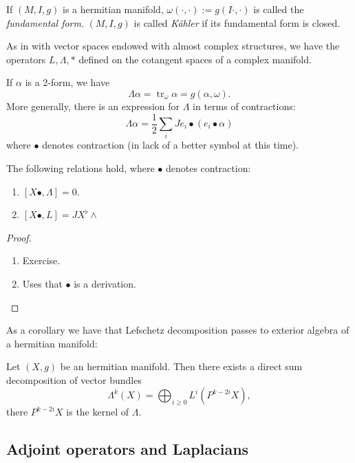 \begin{definition}
\label{definition-fundamental-form}
If $(M,I,g)$ is a hermitian manifold,
$\omega(\cdot,\cdot):=g(I\cdot,\cdot)$
is called the {\it fundamental form}.
$(M,I,g)$ is called {\it Kähler} if its
fundamental form
is closed.
\end{definition}

\noindent
As in with vector spaces endowed with almost
complex structures,
we have the operators $L,\Lambda,*$ defined
on the
cotangent spaces of a complex manifold.

\begin{remark}
\label{remark-lefschetz-operator-trace}
If $\alpha$ is a 2-form, we have
$$
\Lambda \alpha
=
\operatorname{tr}_{\omega}\alpha
=
g(\alpha,\omega).
$$
More generally, there is an expression
for $\Lambda$ in terms of contractions:
$$
\Lambda \alpha = \frac{1}{2}
\sum_i J e_i \bullet (e_i \bullet \alpha)
$$
where $\bullet$ denotes contraction 
(in lack of a better symbol at this time).
\end{remark}

\begin{proposition}
\label{proposition-contractions-commutators}
The following relations hold, where $\bullet$
denotes contraction:
\begin{enumerate}
\item $[X \bullet,\Lambda]=0$.
\item $[X \bullet,L]=JX^\flat \wedge$
\end{enumerate}
\end{proposition}

\begin{proof}
\begin{enumerate}
\item Exercise.
\item Uses that $\bullet$ is a derivation.
\end{enumerate}
\end{proof}

\noindent
As a corollary we have that Lefschetz
decomposition
passes to exterior algebra
of a hermitian manifold:

\begin{corollary}
\label{lemma-lefsc-decom-manif}
Let $(X,g)$ be an hermitian manifold.
Then there exists a direct sum decomposition
of vector bundles
$$
\Lambda^k(X)=\bigoplus_{i\geq
0}L^i(P^{k-2i}X),
$$
there $P^{k-2i}X$ is the kernel of $\Lambda$.
\end{corollary}

\subsection{Adjoint operators and Laplacians}
\label{subsection-adjoints-laplacians}

